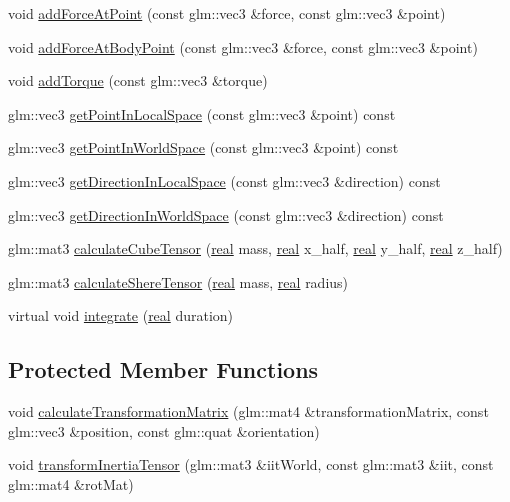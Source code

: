 \begin{DoxyCompactItemize}
void \hyperlink{classrum_1_1_rigid_body_a8bfbbe5f4c71e6e3d484479bcbf98b8e}{add\+Force\+At\+Point} (const glm\+::vec3 \&force, const glm\+::vec3 \&point)
\item 
void \hyperlink{classrum_1_1_rigid_body_a5025fc4cc7be3202b84485ae2fdfdcf7}{add\+Force\+At\+Body\+Point} (const glm\+::vec3 \&force, const glm\+::vec3 \&point)
\item 
void \hyperlink{classrum_1_1_rigid_body_aaaf225465b2beb2e1d5737adb17a1421}{add\+Torque} (const glm\+::vec3 \&torque)
\item 
glm\+::vec3 \hyperlink{classrum_1_1_rigid_body_a4aff0a01d641859d37f87126d15ec277}{get\+Point\+In\+Local\+Space} (const glm\+::vec3 \&point) const
\item 
glm\+::vec3 \hyperlink{classrum_1_1_rigid_body_a6c47248ece653cb70c2bf5e785d3d13c}{get\+Point\+In\+World\+Space} (const glm\+::vec3 \&point) const
\item 
glm\+::vec3 \hyperlink{classrum_1_1_rigid_body_a7904a2e04f4b5b491b1ac092474a96ec}{get\+Direction\+In\+Local\+Space} (const glm\+::vec3 \&direction) const
\item 
glm\+::vec3 \hyperlink{classrum_1_1_rigid_body_a5b6261b8cc054b044219f976d2b9d5e3}{get\+Direction\+In\+World\+Space} (const glm\+::vec3 \&direction) const
\item 
glm\+::mat3 \hyperlink{classrum_1_1_rigid_body_a993bb9d458773a9fc67fad4c5d50ecc6}{calculate\+Cube\+Tensor} (\hyperlink{namespacerum_a7e8cca23573d5eaead0f138cbaa4862c}{real} mass, \hyperlink{namespacerum_a7e8cca23573d5eaead0f138cbaa4862c}{real} x\+\_\+half, \hyperlink{namespacerum_a7e8cca23573d5eaead0f138cbaa4862c}{real} y\+\_\+half, \hyperlink{namespacerum_a7e8cca23573d5eaead0f138cbaa4862c}{real} z\+\_\+half)
\item 
glm\+::mat3 \hyperlink{classrum_1_1_rigid_body_a93de6b632eb6da8fdaafaedb8ca249ab}{calculate\+Shere\+Tensor} (\hyperlink{namespacerum_a7e8cca23573d5eaead0f138cbaa4862c}{real} mass, \hyperlink{namespacerum_a7e8cca23573d5eaead0f138cbaa4862c}{real} radius)
\item 
virtual void \hyperlink{classrum_1_1_rigid_body_a3f9e7cf532fc67b639b489a3875b08fd}{integrate} (\hyperlink{namespacerum_a7e8cca23573d5eaead0f138cbaa4862c}{real} duration)
\end{DoxyCompactItemize}
\subsection*{Protected Member Functions}
\begin{DoxyCompactItemize}
\item 
void \hyperlink{classrum_1_1_rigid_body_a14e0125fad626f899e31e2aa4a4c7a71}{calculate\+Transformation\+Matrix} (glm\+::mat4 \&transformation\+Matrix, const glm\+::vec3 \&position, const glm\+::quat \&orientation)
\item 
void \hyperlink{classrum_1_1_rigid_body_aacbc5d4d598578ebe4624dd5b10d1253}{transform\+Inertia\+Tensor} (glm\+::mat3 \&iit\+World, const glm\+::mat3 \&iit, const glm\+::mat4 \&rot\+Mat)
\end{DoxyCompactItemize}
